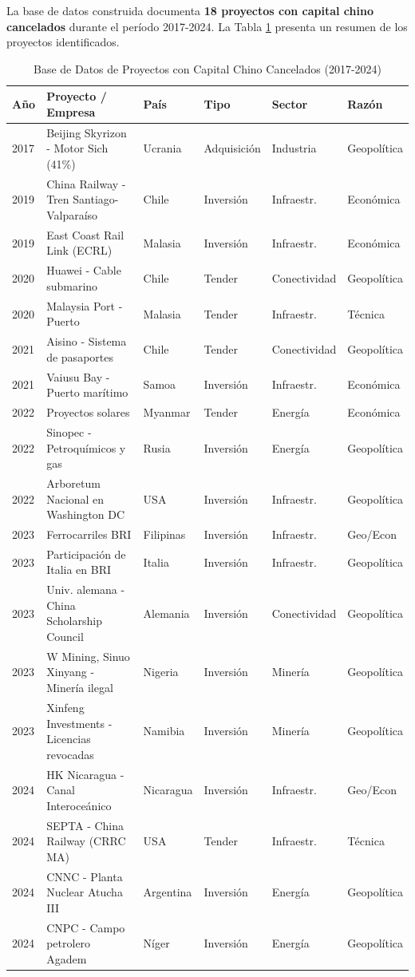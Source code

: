 \documentclass[12pt]{article}
\begin{document}
La base de datos construida documenta \textbf{18 proyectos con capital chino cancelados} durante el período 2017-2024. La Tabla \ref{tab:database} presenta un resumen de los proyectos identificados.

\begin{table}[H]
\centering
\caption{Base de Datos de Proyectos con Capital Chino Cancelados (2017-2024)}
\label{tab:database}
\scriptsize
\begin{tabular}{p{0.8cm}p{3.5cm}p{1.5cm}p{1.2cm}p{1.5cm}p{1.8cm}}
\toprule
\textbf{Año} & \textbf{Proyecto / Empresa} & \textbf{País} & \textbf{Tipo} & \textbf{Sector} & \textbf{Razón} \\
\midrule
2017 & Beijing Skyrizon - Motor Sich (41\%) & Ucrania & Adquisición & Industria & Geopolítica \\
2019 & China Railway - Tren Santiago-Valparaíso & Chile & Inversión & Infraestr. & Económica \\
2019 & East Coast Rail Link (ECRL) & Malasia & Inversión & Infraestr. & Económica \\
2020 & Huawei - Cable submarino & Chile & Tender & Conectividad & Geopolítica \\
2020 & Malaysia Port - Puerto & Malasia & Tender & Infraestr. & Técnica \\
2021 & Aisino - Sistema de pasaportes & Chile & Tender & Conectividad & Geopolítica \\
2021 & Vaiusu Bay - Puerto marítimo & Samoa & Inversión & Infraestr. & Económica \\
2022 & Proyectos solares & Myanmar & Tender & Energía & Económica \\
2022 & Sinopec - Petroquímicos y gas & Rusia & Inversión & Energía & Geopolítica \\
2022 & Arboretum Nacional en Washington DC & USA & Inversión & Infraestr. & Geopolítica \\
2023 & Ferrocarriles BRI & Filipinas & Inversión & Infraestr. & Geo/Econ \\
2023 & Participación de Italia en BRI & Italia & Inversión & Infraestr. & Geopolítica \\
2023 & Univ. alemana - China Scholarship Council & Alemania & Inversión & Conectividad & Geopolítica \\
2023 & W Mining, Sinuo Xinyang - Minería ilegal & Nigeria & Inversión & Minería & Geopolítica \\
2023 & Xinfeng Investments - Licencias revocadas & Namibia & Inversión & Minería & Geopolítica \\
2024 & HK Nicaragua - Canal Interoceánico & Nicaragua & Inversión & Infraestr. & Geo/Econ \\
2024 & SEPTA - China Railway (CRRC MA) & USA & Tender & Infraestr. & Técnica \\
2024 & CNNC - Planta Nuclear Atucha III & Argentina & Inversión & Energía & Geopolítica \\
2024 & CNPC - Campo petrolero Agadem & Níger & Inversión & Energía & Geopolítica \\
\bottomrule
\end{tabular}
\end{table}
\end{document}

